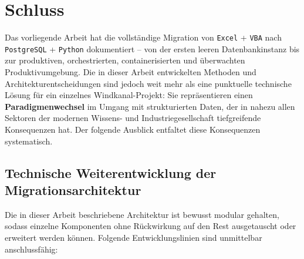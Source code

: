 \documentclass[12pt,a4paper]{report}
\theoremstyle{definition}
\theoremstyle{remark}
\newcommand{\excel}{\texttt{Excel}}
\newcommand{\vba}{\texttt{VBA}}
\newcommand{\pg}{\texttt{PostgreSQL}}
\newcommand{\py}{\texttt{Python}}
\begin{document}
\chapter{Schluss}
\label{sec:final}

Das vorliegende Arbeit hat die vollständige Migration von \excel{} + \vba{}
nach \pg{} + \py{} dokumentiert -- von der ersten leeren Datenbankinstanz
bis zur produktiven, orchestrierten, containerisierten und überwachten
Produktivumgebung. Die in dieser Arbeit entwickelten Methoden und
Architekturentscheidungen sind jedoch weit mehr als eine punktuelle
technische Lösung für ein einzelnes Windkanal-Projekt: Sie
repräsentieren einen \textbf{Paradigmenwechsel} im Umgang mit
strukturierten Daten, der in nahezu allen Sektoren der modernen
Wissens- und Industriegesellschaft tiefgreifende Konsequenzen hat.
Der folgende Ausblick entfaltet diese Konsequenzen systematisch.

\section{Technische Weiterentwicklung der Migrationsarchitektur}

Die in dieser Arbeit beschriebene Architektur ist bewusst modular
gehalten, sodass einzelne Komponenten ohne Rückwirkung auf den Rest
ausgetauscht oder erweitert werden können.
Folgende Entwicklungslinien sind unmittelbar anschlussfähig:
\end{document}
